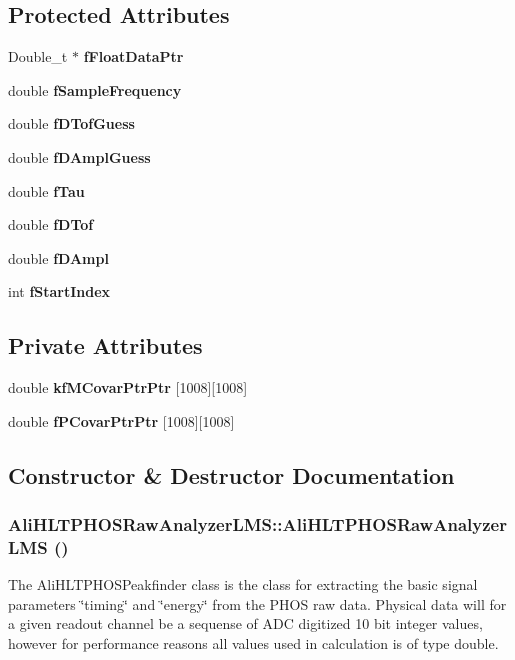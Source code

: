 \subsection*{Protected Attributes}
\begin{CompactItemize}
\item 
Double\_\-t $\ast$ {\bf f\-Float\-Data\-Ptr}
\item 
double {\bf f\-Sample\-Frequency}
\item 
double {\bf f\-DTof\-Guess}
\item 
double {\bf f\-DAmpl\-Guess}
\item 
double {\bf f\-Tau}
\item 
double {\bf f\-DTof}
\item 
double {\bf f\-DAmpl}
\item 
int {\bf f\-Start\-Index}
\end{CompactItemize}
\subsection*{Private Attributes}
\begin{CompactItemize}
\item 
double {\bf kf\-MCovar\-Ptr\-Ptr} [1008][1008]
\item 
double {\bf f\-PCovar\-Ptr\-Ptr} [1008][1008]
\end{CompactItemize}


\subsection{Constructor \& Destructor Documentation}
\subsubsection{\setlength{\rightskip}{0pt plus 5cm}Ali\-HLTPHOSRaw\-Analyzer\-LMS::Ali\-HLTPHOSRaw\-Analyzer\-LMS ()}\label{classAliHLTPHOSRawAnalyzerLMS_AliHLTPHOSRawAnalyzerLMSa0}


The Ali\-HLTPHOSPeakfinder class is the class for extracting the basic signal parameters \char`\"{}timing\char`\"{} and \char`\"{}energy\char`\"{} from the PHOS raw data. Physical data will for a given readout channel be a sequense of ADC digitized 10 bit integer values, however for performance reasons all values used in calculation is of type double. 

